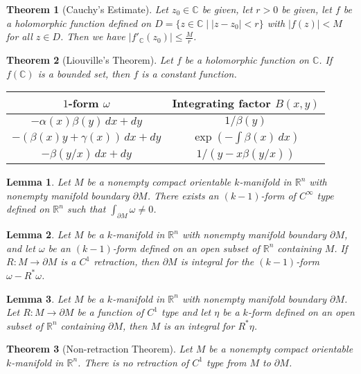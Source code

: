 \documentclass[9pt]{article}
\theoremstyle{break}
\theoremstyle{break}
\newtheorem{thm}{Theorem}[section]
\newtheorem{lem}{Lemma}[thm]
\newcommand{\R}{\mathbb{R}}
\newcommand{\Complex}{\mathbb{C}}
\begin{document}
\begin{thm}[Cauchy's Estimate]
Let $z_0 \in \Complex$ be given, let $r>0$ be given, let $f$ be a holomorphic function defined on $D = \{ z \in \Complex \mid |z-z_0| < r\}$ with $|f(z)|<M$ for all $z \in D$. Then we have $|f'_{\Complex}(z_0)| \leq \frac{M}{r}$. 
\end{thm}


\begin{thm}[Liouville's Theorem]
Let $f$ be a holomorphic function on $\Complex$. If $f(\Complex)$ is a bounded set, then $f$ is a constant function.
\end{thm}

\begin{center}
\begin{tabular}{|c|c|}
\hline
\cellcolor{orange!29} $1$-form $\omega$ & \cellcolor{blue!29} Integrating factor $B(x,y)$\\
\hline
$-\alpha(x)\beta(y)\, dx + dy$ & $1/\beta(y)$ \\
\hline
$-(\beta(x)y+\gamma(x))\, dx + dy$ & $\exp(-\int \beta(x)\, dx)$\\
\hline
$-\beta(y/x)\, dx + dy$ & $1/(y-x\beta(y/x))$\\
\hline
\end{tabular}
\end{center}

\begin{lem}
Let $M$ be a nonempty compact orientable $k$-manifold in $\R^n$ with nonempty manifold boundary $\partial M$. There exists an $(k-1)$-form of $C^\infty$ type defined on $\R^n$ such that $\int_{\partial M}\omega \neq 0$. 
\end{lem}

\begin{lem}
Let $M$ be a $k$-manifold in $\R^n$ with nonempty manifold boundary $\partial M$, and let $\omega$ be an $(k-1)$-form defined on an open subset of $\R^n$ containing $M$. If $R:M \to \partial M$ is a $C^1$ retraction, then $\partial M$ is integral for the $(k-1)$-form $\omega - R^*\omega$. 
\end{lem}

\begin{lem}
Let $M$ be a $k$-manifold in $\R^n$ with nonempty manifold boundary $\partial M$. Let $R:M \to \partial M$ be a function of $C^1$ type and let $\eta$ be a $k$-form defined on an open subset of $\R^n$ containing $\partial M$, then $M$ is an integral for $R^*\eta$. 
\end{lem}

\begin{thm}[Non-retraction Theorem]
Let $M$ be a nonempty compact orientable $k$-manifold in $\R^n$. There is no retraction of $C^1$ type from $M$ to $\partial M$. 
\end{thm}
\end{document}
